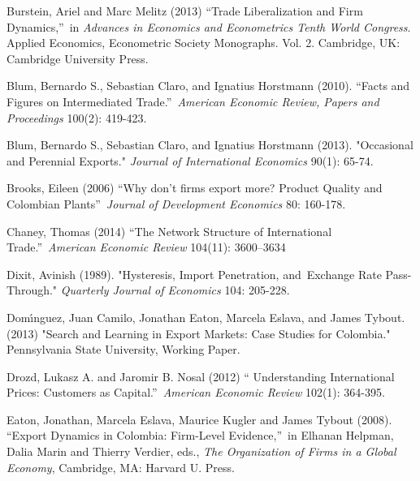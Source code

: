 \documentclass[12pt]{article}
\begin{document}
\begin{description}
\item Burstein, Ariel and Marc Melitz (2013) \textquotedblleft Trade
Liberalization and Firm Dynamics,\textquotedblright\ in \textit{Advances in
Economics and Econometrics Tenth World Congress}. Applied Economics,
Econometric Society Monographs. Vol. 2. Cambridge, UK: Cambridge University
Press.

\item Blum, Bernardo S., Sebastian Claro, and Ignatius Horstmann (2010).
\textquotedblleft Facts and Figures on Intermediated
Trade.\textquotedblright\ \textit{American Economic Review, Papers and
Proceedings} 100(2): 419-423.

\item Blum, Bernardo S., Sebastian Claro, and Ignatius Horstmann (2013).
"Occasional and Perennial Exports." \textit{Journal of International
Economics} 90(1): 65-74.

\item Brooks, Eileen (2006) \textquotedblleft Why don't firms export more?
Product Quality and Colombian Plants\textquotedblright\ \textit{Journal of
Development Economics} 80: 160-178.

\item Chaney, Thomas (2014) \textquotedblleft The Network Structure of
International Trade.\textquotedblright\ \textit{American Economic Review}
104(11): 3600--3634

\item Dixit, Avinish (1989). "Hysteresis, Import Penetration, and\ Exchange
Rate Pass-Through." \textit{Quarterly Journal of Economics} 104: 205-228.

\item Dom\'{\i}nguez, Juan Camilo, Jonathan Eaton, Marcela Eslava, and James
Tybout. (2013) "Search and Learning in Export Markets: Case Studies for
Colombia." Pennsylvania State University, Working Paper.

\item Drozd, Lukasz A. and Jaromir B. Nosal (2012) \textquotedblleft
Understanding International Prices: Customers as Capital.\textquotedblright\ 
\textit{American Economic Review} 102(1): 364-395.

\item Eaton, Jonathan, Marcela Eslava, Maurice Kugler and James Tybout
(2008). \textquotedblleft Export Dynamics in Colombia: Firm-Level
Evidence,\textquotedblright\ in Elhanan Helpman, Dalia Marin and Thierry
Verdier, eds., \textit{The Organization of Firms in a Global Economy},
Cambridge, MA: Harvard U. Press.


\end{description}
\end{document}
